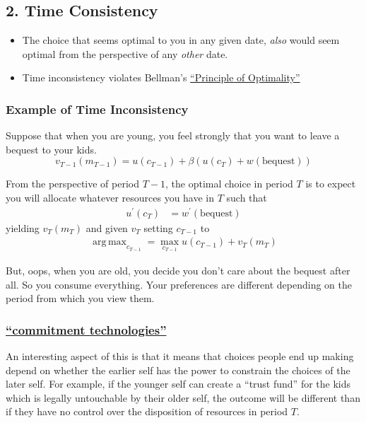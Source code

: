\documentclass{scrartcl}
\DeclareMathOperator*{\argmax}{arg\,max}
\begin{document}
\label{time-consistency}
\subsection*{2. Time Consistency}

\begin{itemize}
\item The choice that seems optimal to you in any given date, \emph{also} would seem optimal from the perspective of any \emph{other} date.
\item Time inconsistency violates Bellman's \href{https://www.ques10.com/p/8343/bellmans-principle-of-optimality}{``Principle of Optimality''}
\end{itemize}

\label{example-of-time-inconsistency}
\subsubsection*{Example of Time Inconsistency}

Suppose that when you are young, you feel strongly that you want to leave a bequest to your kids.
\[ v_{T-1}(m_{T-1}) = u(c_{T-1}) + \beta \left(u(c_{T}) + w(\text{bequest})\right)
\]

From the perspective of period $T-1$, the optimal choice in period $T$ is to expect you will allocate whatever resources you have in $T$ such that
\begin{align}
u^{\prime}(c_{T}) &= w^{\prime}(\text{bequest})
\end{align}
yielding $v_{T}(m_{T})$ and given $v_{T}$ setting $c_{T-1}$ to 
\begin{align}
  \argmax_{c_{T-1}} = \max_{c_{T-1}} u(c_{T-1}) + v_{T}(m_{T})
\end{align}

But, oops, when you are old, you decide you don't care about the bequest after all.  So you consume everything.  Your preferences are different depending on the period from which you view them.

\subsubsection*{\href{https://en.wikipedia.org/wiki/Commitment_device}{``commitment technologies''}}
An interesting aspect of this is that it means that choices people end up making depend on whether the earlier self has the power to constrain the choices of the later self.  For example, if the younger self can create a ``trust fund'' for the kids which is legally untouchable by their older self, the outcome will be different than if they have no control over the disposition of resources in period $T$.
\end{document}
